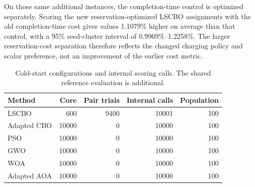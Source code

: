 On those same additional instances, the completion-time control is optimized separately. Scoring the new reservation-optimized LSCBO assignments with the old completion-time cost gives values 1.1079\% higher on average than that control, with a 95\% seed-cluster interval of 0.9969\%--1.2258\%. The larger reservation-cost separation therefore reflects the changed charging policy and scalar preference, not an improvement of the earlier cost metric.

\begin{table}[htbp]\centering\small
\caption{Cold-start configurations and internal scoring calls. The shared reference evaluation is additional.}\label{tab:configuration_map}
\setlength{\tabcolsep}{3pt}
\begin{tabular}{lrrrr}
\toprule Method & Core & Pair trials & Internal calls & Population\\
\midrule LSCBO & 600 & 9400 & 10001 & 100\\
Adapted CBO & 10000 & 0 & 10000 & 100\\
PSO & 10000 & 0 & 10000 & 100\\
GWO & 10000 & 0 & 10000 & 100\\
WOA & 10000 & 0 & 10000 & 100\\
Adapted AOA & 10000 & 0 & 10000 & 100\\
\bottomrule\end{tabular}
\par{}
\end{table}\FloatBarrier
